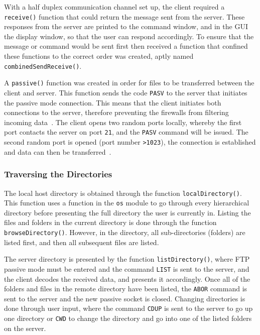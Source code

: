 \documentclass[10pt, conference]{IEEEtran}
\def\code#1{\texttt{#1}}
\begin{document}
With a half duplex communication channel set up, the client required a \code{receive()} function that  could return the message sent from the server. These responses from the server are printed to the command window, and in the GUI the display window, so that the user can respond accordingly. To ensure that the message or command would be sent first then received a function that confined these functions to the correct order was created, aptly named \code{combinedSendReceive()}.

A \code{passive()} function was created in order for files to be transferred between the client and server. This function sends the code \code{PASV} to the server that initiates the passive mode connection. This means that the client initiates both connections to the server, therefore preventing the firewalls from filtering incoming data~\cite{passive}. The client opens two random ports locally, whereby the first port contacts the server on port \code{21}, and the \code{PASV} command will be issued. The second random port is opened (port number \code{>1023}), the connection is established and data can then be transferred~\cite{passive}.

\subsubsection{Traversing the Directories}
\label{sec: Traversing directories}
The local host directory is obtained through the function \code{localDirectory()}. This function uses a function in the \code{os} module to go through every hierarchical directory before presenting the full directory the user is currently in. Listing the files and folders in the current directory is done through the function \code{browseDirectory()}. However, in the directory, all sub-directories (folders) are listed first, and then all subsequent files are listed.

The server directory is presented by the function \code{listDirectory()}, where FTP passive mode must be entered and the command \code{LIST} is sent to the server, and the client decodes the received data, and presents it accordingly. Once all of the folders and files in the remote directory have been listed, the \code{ABOR} command is sent to the server and the new passive socket is closed. Changing directories is done through user input, where the command \code{CDUP} is sent to the server to go up one directory or \code{CWD} to change the directory and go into one of the listed folders on the server.
\end{document}

